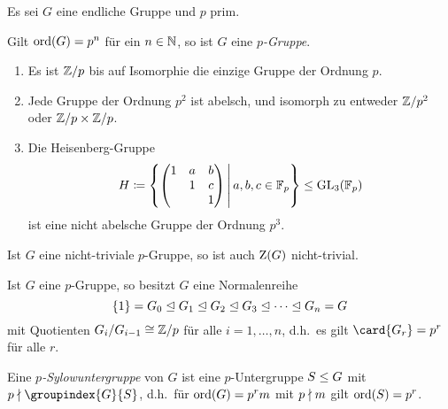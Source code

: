 Es sei $G$ eine endliche Gruppe und $p$ prim.

\begin{definition}
  Gilt $\operatorname{ord}(G) = p^n$ für ein $n \in \mathbb{N}$, so ist $G$ eine \emph{$p$-Gruppe}.
\end{definition}

\begin{example}
  \begin{enumerate}
    \item
      Es ist $\mathbb{Z}/p$ bis auf Isomorphie die einzige Gruppe der Ordnung $p$.
    \item
      Jede Gruppe der Ordnung $p^2$ ist abelsch, und isomorph zu entweder $\mathbb{Z}/p^2$ oder $\mathbb{Z}/p \times \mathbb{Z}/p$.
    \item
      Die Heisenberg-Gruppe
      \[
                  H
        \defined  \left\{
                    \begin{pmatrix}
                      1 & a & b \\
                        & 1 & c \\
                        &   & 1
                    \end{pmatrix}
                  \suchthat*
                    a, b, c \in \Finite_p
                  \right\}
        \subgroup \GL{3}{\Finite_p}
      \]
      ist eine nicht abelsche Gruppe der Ordnung $p^3$.
  \end{enumerate}
\end{example}

\begin{lemma}
  Ist $G$ eine nicht-triviale $p$-Gruppe, so ist auch $\operatorname{Z}(G)$ nicht-trivial.
\end{lemma}

\begin{corollary}
  Ist $G$ eine $p$-Gruppe, so besitzt $G$ eine Normalenreihe
  \[
                  \{ 1 \}
    =             G_0
    \mathrel{\trianglelefteq}  G_1
    \mathrel{\trianglelefteq}  G_2
    \mathrel{\trianglelefteq}  G_3
    \mathrel{\trianglelefteq}  \dotsb
    \mathrel{\trianglelefteq}  G_n
    =             G
  \]
  mit Quotienten $G_i / G_{i-1} \cong \mathbb{Z}/p$ für alle $i = 1, \dotsc, n$, d.h.\ es gilt $\card{G_r} = p^r$ für alle $r$.
\end{corollary}

\begin{definition}
  Eine \emph{$p$-Sylow\-unter\-gruppe} von $G$ ist eine $p$-Untergruppe $S \mathrel{\leq} G$ mit $p \notdivides \groupindex{G}{S}$, d.h.\ für $\operatorname{ord}(G) = p^r m$ mit $p \mathrel{\nmid} m$ gilt $\operatorname{ord}(S) = p^r$.
\end{definition}

